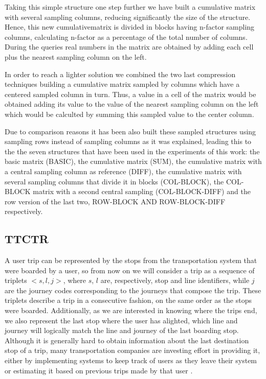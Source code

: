 \documentclass[runningheads]{llncs}
\newcommand{\ttctr}{TTCTR}
\begin{document}
Taking this simple structure one step further we have built a cumulative matrix with several sampling columns, reducing significantly the size of the structure. Hence, this new cumulativematrix is divided in blocks having n-factor sampling columns, calculating n-factor as a percentage
of the total number of columns. During the queries real numbers in the matrix are obtained by adding each cell plus the nearest sampling column on the left.



In order to reach a lighter solution we combined the two last compression techniques building a cumulative matrix sampled by columns which have a centered sampled column in turn. Thus, a value in a cell of the matrix would be obtained adding its value to the value of the nearest sampling column on the left which would be calculted by summing this sampled value to the center column.



Due to comparison reasons it has been also built these sampled structures using sampling rows instead of sampling columns as it was explained, leading this to the the seven structures that have been used in the experiments of this work: the basic matrix (BASIC), the cumulative matrix (SUM), the cumulative matrix with a central sampling column as reference (DIFF), the cumulative matrix with several sampling columns that divide it in blocks (COL-BLOCK), the COL-BLOCK matrix with a second central sampling (COL-BLOCK-DIFF) and the row version of the last two, ROW-BLOCK AND ROW-BLOCK-DIFF respectively.


\subsection{\ttctr}
A user trip can be represented by the stops from the transportation system that were boarded by a user, so from now on we will consider a trip as a sequence of triplets $<s,l,j>$, where $s$, $l$ are, respectively, stop and line identifiers, while $j$ are the journey codes corresponding to the journeys that compose the trip. These triplets describe a trip in a consecutive fashion, on the same order as the stops were boarded. Additionally, as we are interested in knowing where the trips end, we also represent the last stop where the user has alighted, which line and journey will logically match the line and journey of the last boarding stop. Although it is generally hard to obtain information about the last destination stop of a trip, many transportation companies are investing effort in providing it, either by implementing systems to keep track of users as they leave their system or estimating it based on previous trips made by that user \cite{alsger2016validating}.
\end{document}
